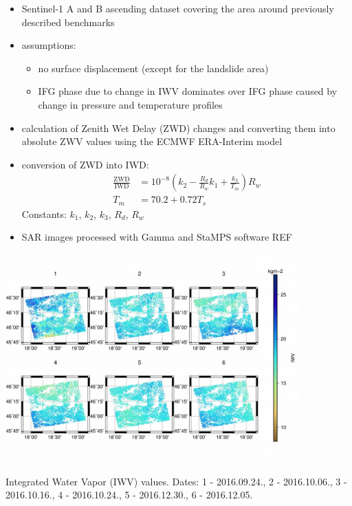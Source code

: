 \documentclass{beamer}
\begin{document}
\begin{frame}{\ft}
    \begin{itemize}
        \item Sentinel-1 A and B ascending dataset covering the area around previously described benchmarks
        \item assumptions:
        \begin{itemize}
            \item no surface displacement (except for the landslide area)
            \item IFG phase due to change in IWV dominates over IFG phase caused by change in pressure and temperature profiles
        \end{itemize}
        \item calculation of Zenith Wet Delay (ZWD) changes and converting them into absolute ZWV values using the ECMWF ERA-Interim model
        \item conversion of ZWD into IWD:
        \begin{align*}
            \frac{\mathrm{ZWD}}{\mathrm{IWD}} &= 10^{-8} \left(k_2 - \frac{R_d}{R_w} k_1 + \frac{k_3}{T_m} \right) R_w \\
            T_m &= 70.2 + 0.72 T_s
        \end{align*}
        Constants: $k_1$, $k_2$, $k_3$, $R_d$, $R_w$
        \item SAR images processed with Gamma and StaMPS software REF
    \end{itemize}    
\end{frame}


\begin{frame}{\ft}
    \begin{center}
        \includegraphics[width=0.85\textwidth]{iwv.png}
        \vspace{-20pt}
        
        {\small Integrated Water Vapor (IWV) values. Dates:  1 - 2016.09.24., 2 - 2016.10.06., 3 - 2016.10.16., 4 - 2016.10.24., 5 - 2016.12.30., 6 - 2016.12.05.}
    \end{center}
\end{frame}
\end{document}
